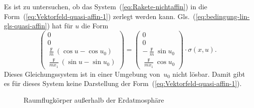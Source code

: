 \begin{example}
Es ist zu untersuchen, ob das System~(\ref{eq:Rakete-nichtaffin})
in die Form~(\ref{eq:Vektorfeld-quasi-affin-1}) zerlegt werden kann.
Gls.~(\ref{eq:bedingung-lin-gls-quasi-affin}) hat für $u$ die Form
\[
\left(\begin{array}{c}
0\\
0\\
\frac{\digamma}{m}\left(\cos u-\cos u_{0}\right)\\
\frac{\digamma}{mx_{1}}\left(\sin u-\sin u_{0}\right)
\end{array}\right)=\left(\begin{array}{c}
0\\
0\\
-\frac{\digamma}{m}\sin u_{0}\\
\frac{\digamma}{mx_{1}}\cos u_{0}
\end{array}\right)\cdot\sigma(x,u).
\]
Dieses Gleichungssystem ist in einer Umgebung von~$u_{0}$ nicht
lösbar. Damit gibt es für dieses System keine Darstellung der Form~(\ref{eq:Vektorfeld-quasi-affin-1}).
\end{example}
\begin{figure}
\begin{centering}
\resizebox{0.45\textwidth}{!}{}
\par\end{centering}
\caption{Raumflugkörper außerhalb der Erdatmosphäre\label{fig:Raumflugkoerper}}
\end{figure}

